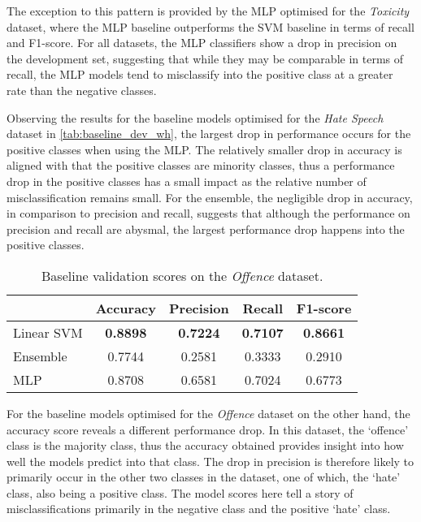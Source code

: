 The exception to this pattern is provided by the MLP optimised for the \textit{Toxicity} dataset, where the MLP baseline outperforms the SVM baseline in terms of recall and F1-score.
For all datasets, the MLP classifiers show a drop in precision on the development set, suggesting that while they may be comparable in terms of recall, the MLP models tend to misclassify into the positive class at a greater rate than the negative classes.

Observing the results for the baseline models optimised for the \textit{Hate Speech} dataset in \cref{tab:baseline_dev_wh}, the largest drop in performance occurs for the positive classes when using the MLP.
The relatively smaller drop in accuracy is aligned with that the positive classes are minority classes, thus a performance drop in the positive classes has a small impact as the relative number of misclassification remains small.
For the ensemble, the negligible drop in accuracy, in comparison to precision and recall, suggests that although the performance on precision and recall are abysmal, the largest performance drop happens into the positive classes.

\begin{table}[h]
  \centering
  \begin{tabular}{l|cccc}
               & Accuracy        & Precision       & Recall          & F1-score        \\ \hline
    Linear SVM & \textbf{0.8898} & \textbf{0.7224} & \textbf{0.7107} & \textbf{0.8661} \\
    Ensemble   & 0.7744          & 0.2581          & 0.3333          & 0.2910          \\
    MLP        & 0.8708          & 0.6581          & 0.7024          & 0.6773
  \end{tabular}
  \caption{Baseline validation scores on the \textit{Offence} dataset.}
  \label{tab:baseline_dev_davidson}
\end{table}

For the baseline models optimised for the \textit{Offence} dataset on the other hand, the accuracy score reveals a different performance drop.
In this dataset, the `offence' class is the majority class, thus the accuracy obtained provides insight into how well the models predict into that class.
The drop in precision is therefore likely to primarily occur in the other two classes in the dataset, one of which, the `hate' class, also being a positive class.
The model scores here tell a story of misclassifications primarily in the negative class and the positive `hate' class.


